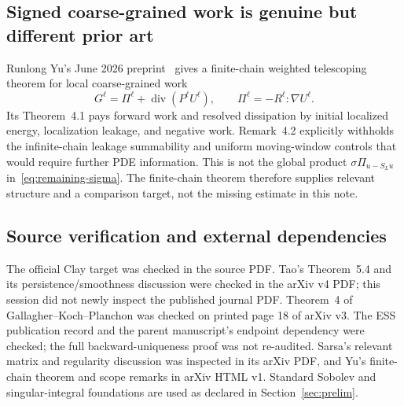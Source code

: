 \documentclass[11pt,a4paper]{article}
\theoremstyle{definition}
\DeclareMathOperator{\diver}{div}
\begin{document}
\subsection{Signed coarse-grained work is genuine but different prior art}
Runlong Yu's June 2026 preprint~\cite{Yu} gives a finite-chain weighted telescoping theorem for local coarse-grained work
\[
 G^\ell=\Pi^\ell+\diver(P^\ell U^\ell),
 \qquad \Pi^\ell=-R^\ell:\nabla U^\ell.
\]
Its Theorem~4.1 pays forward work and resolved dissipation by initial localized energy, localization leakage, and negative work. Remark~4.2 explicitly withholds the infinite-chain leakage summability and uniform moving-window controls that would require further PDE information. This is not the global product $\sigma\Pi_{u-S_Lu}$ in~\eqref{eq:remaining-sigma}. The finite-chain theorem therefore supplies relevant structure and a comparison target, not the missing estimate in this note.

\subsection{Source verification and external dependencies}
The official Clay target was checked in the source PDF. Tao's Theorem~5.4 and its persistence/smoothness discussion were checked in the arXiv v4 PDF; this session did not newly inspect the published journal PDF. Theorem~4 of Gallagher--Koch--Planchon was checked on printed page 18 of arXiv v3. The ESS publication record and the parent manuscript's endpoint dependency were checked; the full backward-uniqueness proof was not re-audited. Sarsa's relevant matrix and regularity discussion was inspected in its arXiv PDF, and Yu's finite-chain theorem and scope remarks in arXiv HTML v1. Standard Sobolev and singular-integral foundations are used as declared in Section~\ref{sec:prelim}.
\end{document}
